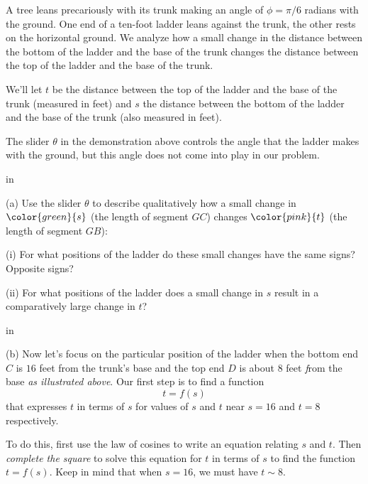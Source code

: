 \documentclass{ximera}
\newcommand{\pskip}{\vskip 0.1 in}
\begin{document}
\begin{example}  \label{Ex324trertg}

A tree leans precariously with its trunk making an angle of $\phi = \pi/6$ radians with the ground. One end of a ten-foot ladder leans against the trunk, the other rests on the horizontal ground. We analyze how a small change in the distance between the bottom of the ladder and the base of the trunk changes the distance between the top of the ladder and the base of the trunk.


 
\begin{onlineOnly}
    \begin{center}
\end{center}
\end{onlineOnly}

We'll let $t$ be the distance between the top of the ladder and the base of the trunk (measured in feet) and $s$ the distance between the bottom of the ladder and the base of the trunk (also measured in feet).

The slider $\theta$ in the demonstration above controls the angle that the ladder makes with the ground, but this angle does not come into play in our problem.

\pskip

(a) Use the slider $\theta$ to describe qualitatively how a small change in $\color{green}{s}$ (the length of segment $GC$) changes $\color{pink}{t}$ (the length of segment $GB$):

(i) For what positions of the ladder do these small changes have the same signs? Opposite signs?

(ii) For what positions of the ladder does a small change in $s$ result in a comparatively large change in $t$?

\pskip

(b) Now let's focus on the particular position of the ladder when the bottom end $C$ is $16$ feet from the trunk's base and the top end $D$ is about $8$ feet \emph from the base \emph{as illustrated above}. Our first step is to find a function 
\[
   t = f(s) 
\]
that expresses $t$ in terms of $s$ for values of $s$ and $t$ near $s=16$ and $t=8$ respectively. 

To do this, first use the law of cosines to write an equation relating $s$ and $t$. Then \emph{complete the square} to solve this equation for $t$ in terms of $s$ to find the function $t = f(s)$. Keep in mind that when $s=16$, we must have $t\sim 8$. %



\end{example}
\end{document}

